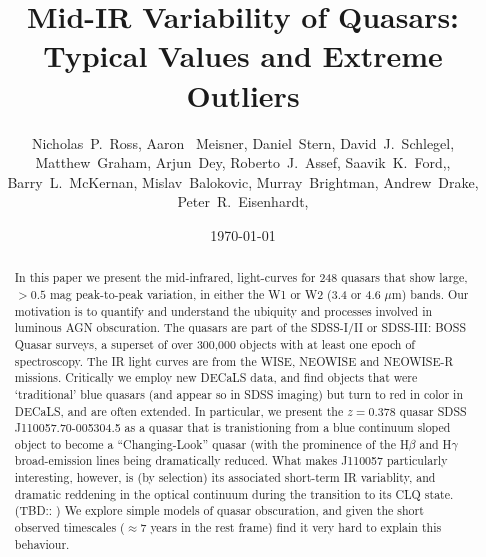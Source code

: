 \documentclass{emulateapj}
\begin{document}

\title{Mid-IR Variability of Quasars:  \\
       Typical Values and Extreme Outliers
}
\author{
Nicholas~P.~Ross, 
Aaron~ Meisner, 
Daniel~Stern,
David~J.~Schlegel,
Matthew~Graham, 
Arjun~Dey,
Roberto~J.~Assef,
Saavik~K.~Ford,, 
Barry~L.~McKernan,
Mislav~Balokovic, 
Murray~Brightman, 
Andrew~Drake, 
Peter~R.~Eisenhardt, 
}


\date{\today}

\begin{abstract}
In this paper we present the mid-infrared, light-curves for 248 quasars that show large, $>0.5$
mag peak-to-peak variation, in either the W1 or W2 (3.4 or 4.6 $\mu$m)
bands. Our motivation is to quantify and understand the ubiquity and
processes involved in luminous AGN obscuration.  The quasars are part
of the SDSS-I/II or SDSS-III: BOSS Quasar surveys, a superset of over
300,000 objects with at least one epoch of spectroscopy. The IR light
curves are from the WISE, NEOWISE and NEOWISE-R missions. 
Critically we employ new DECaLS data, and find objects that were
`traditional' blue quasars (and appear so in SDSS imaging) but turn to
red in color in DECaLS, and are often extended.
In particular, we present the $z=0.378$ quasar SDSS
J110057.70-005304.5 as a quasar that is tranistioning from a blue
continuum sloped object to become a ``Changing-Look'' quasar (with the
prominence of the H$\beta$ and H$\gamma$ broad-emission lines being
dramatically reduced. What makes J110057 particularly interesting,
however, is (by selection) its associated short-term IR variablity,
and dramatic reddening in the optical continuum during the transition
to its CLQ state.
(TBD:: ) We explore simple models of quasar obscuration, and given the
short observed timescales ($\approx$7 years in the rest frame) find it
very hard to explain this behaviour.
\end{abstract}
\end{document}
